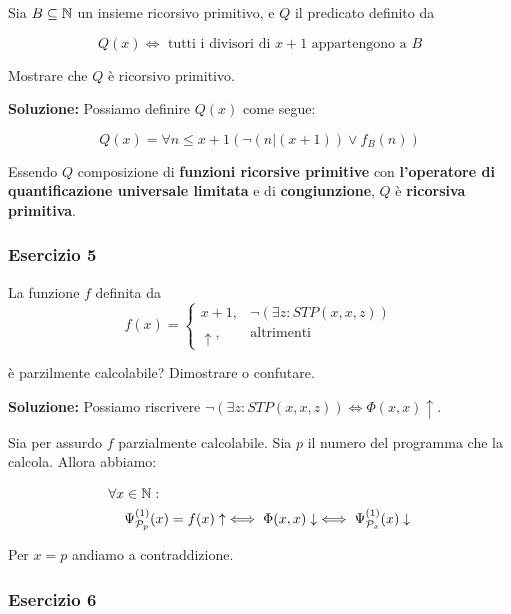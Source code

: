 Sia \(B\subseteq \mathbb{N}\) un insieme ricorsivo primitivo, e \(Q\) il predicato definito da

\begin{equation}
  Q(x) \iff \text{ tutti i divisori di } x+1 \text{ appartengono a } B
\end{equation}

Mostrare che \(Q\) è ricorsivo primitivo.

\textbf{Soluzione: } Possiamo definire \(Q(x)\) come segue:

\begin{equation}
  Q(x) = \forall n \leq x+1 (\neg (n \vert (x+1)) \lor f_B(n))
\end{equation}

Essendo \(Q\) composizione di \textbf{funzioni ricorsive primitive} con \textbf{l'operatore di quantificazione universale limitata} e di \textbf{congiunzione}, \(Q\) è \textbf{ricorsiva primitiva}.

\subsubsection{Esercizio 5}

La funzione \(f\) definita da
\begin{equation}
  f(x) = \begin{cases}
    x+1, & \neg(\exists z : STP(x,x,z))\\
    \uparrow, & \text{altrimenti}
  \end{cases}
\end{equation}

è parzilmente calcolabile? Dimostrare o confutare.

\textbf{Soluzione: } Possiamo riscrivere \(\neg(\exists z : STP(x,x,z)) \iff \Phi(x,x) \uparrow\).

Sia per assurdo \(f\) parzialmente calcolabile. Sia \(p\) il numero del programma che la calcola. Allora abbiamo:

\begin{equation}
  \begin{split}
    \forall x &\in \mathbb{N}:\\
    &\Psi_{\mathcal{P}_p}^{(1)}(x) = f(x) \uparrow \iff \Phi(x,x) \downarrow \iff \Psi_{\mathcal{P}_x}^{(1)}(x) \downarrow
  \end{split}
\end{equation}

Per \(x=p\) andiamo a contraddizione.

\subsubsection{Esercizio 6}

